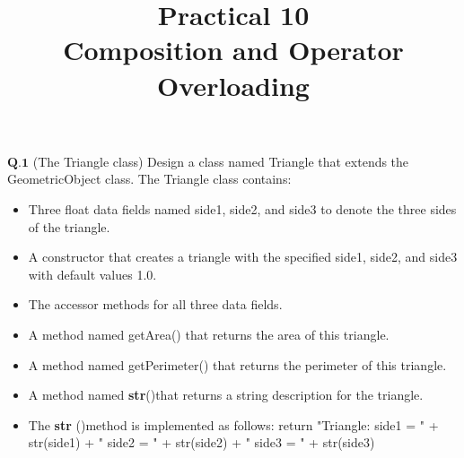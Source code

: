 \documentclass[11pt]{article}
\title{Practical 10 \\ Composition and Operator Overloading}
\providecommand{\tightlist}{%
      \setlength{\itemsep}{0pt}\setlength{\parskip}{0pt}}
\begin{document}
    
    \maketitle    
    \(\textbf{Q.1}\) (The Triangle class) Design a class named Triangle that
extends the GeometricObject class. The Triangle class contains:
\begin{itemize}
\tightlist
\item Three float data fields named side1, side2, and side3 to denote the three
sides of the triangle. 
\item A constructor that creates a triangle with the
specified side1, side2, and side3 with default values 1.0. 
\item The accessor methods for all three data fields. \item A method named getArea() that returns the area of this triangle. 
\item A method named getPerimeter() that returns the perimeter of this triangle. 
\item A method named \textbf{str}()that returns a string description for the triangle. 
\item The \textbf{str} ()method is implemented as follows: return "Triangle: side1 = " + str(side1) + " side2 = " + str(side2) + " side3 = " + str(side3)
\end{itemize}
\end{document}
